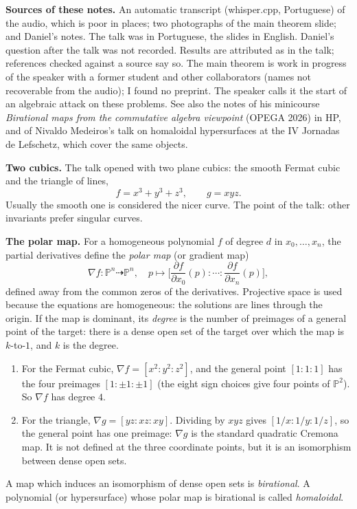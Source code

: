 \medskip\noindent
{\bf Sources of these notes.} An automatic
transcript (whisper.cpp, Portuguese) of the
audio, which is poor in places; two
photographs of the main theorem slide; and
Daniel's notes. The talk was in Portuguese,
the slides in English. Daniel's question
after the talk was not recorded. Results are
attributed as in the talk; references
checked against a source say so. The main
theorem is work in progress of the speaker
with a former student and other
collaborators (names not recoverable from the
audio); I found no preprint. The speaker
calls it the start of an algebraic attack on
these problems. See also the notes of his
minicourse \emph{Birational maps from the
commutative algebra viewpoint} (OPEGA 2026)
in HP, and of Nivaldo Medeiros's talk on
homaloidal hypersurfaces at the IV Jornadas
de Lefschetz, which cover the same objects.

\medskip\noindent
{\bf Two cubics.} The talk opened with two
plane cubics: the smooth Fermat cubic and the
triangle of lines,
$$
f = x^3 + y^3 + z^3,
\qquad
g = xyz.
$$
Usually the smooth one is considered the
nicer curve. The point of the talk: other
invariants prefer singular curves.

\medskip\noindent
{\bf The polar map.} For a homogeneous
polynomial $f$ of degree $d$ in
$x_0, \ldots, x_n$, the partial derivatives
define the \emph{polar map} (or gradient
map)
$$
\nabla f : \mathbb{P}^n \dashrightarrow
\mathbb{P}^n,
\quad
p \longmapsto
\Big[\frac{\partial f}{\partial x_0}(p) :
\cdots :
\frac{\partial f}{\partial x_n}(p)\Big],
$$
defined away from the common zeros of the
derivatives. Projective space is used
because the equations are homogeneous: the
solutions are lines through the origin. If
the map is dominant, its \emph{degree} is
the number of preimages of a general point
of the target: there is a dense open set of
the target over which the map is
$k$-to-$1$, and $k$ is the degree.
\begin{enumerate}
\item For the Fermat cubic,
$\nabla f = [x^2 : y^2 : z^2]$, and the
general point $[1:1:1]$ has the four
preimages $[1:\pm1:\pm1]$ (the eight sign
choices give four points of
$\mathbb{P}^2$). So $\nabla f$ has degree
$4$.
\item For the triangle,
$\nabla g = [yz : xz : xy]$. Dividing by
$xyz$ gives $[1/x : 1/y : 1/z]$, so the
general point has one preimage: $\nabla g$
is the standard quadratic Cremona map. It is
not defined at the three coordinate points,
but it is an isomorphism between dense open
sets.
\end{enumerate}
A map which induces an isomorphism of dense
open sets is \emph{birational}. A polynomial
(or hypersurface) whose polar map is
birational is called \emph{homaloidal}.

